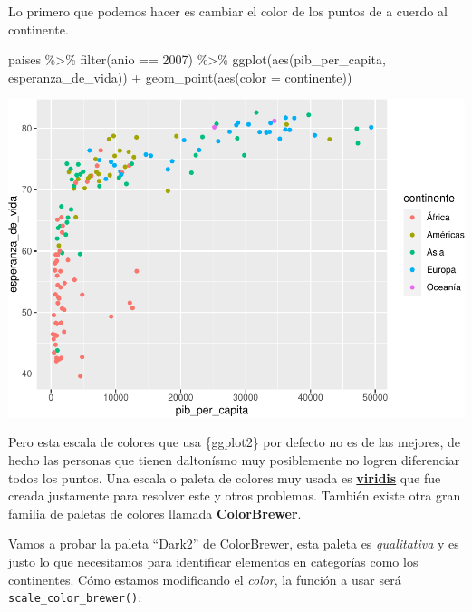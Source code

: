 \documentclass[
  openany]{book}
\newenvironment{Shaded}{\begin{snugshade}}{\end{snugshade}}
\newcommand{\AttributeTok}[1]{\textcolor[rgb]{0.77,0.63,0.00}{#1}}
\newcommand{\DecValTok}[1]{\textcolor[rgb]{0.00,0.00,0.81}{#1}}
\newcommand{\FunctionTok}[1]{\textcolor[rgb]{0.00,0.00,0.00}{#1}}
\newcommand{\NormalTok}[1]{#1}
\newcommand{\SpecialCharTok}[1]{\textcolor[rgb]{0.00,0.00,0.00}{#1}}
\begin{document}
Lo primero que podemos hacer es cambiar el color de los puntos de a cuerdo al continente.

\begin{Shaded}
\begin{Highlighting}[]
\NormalTok{paises }\SpecialCharTok{\%\textgreater{}\%} 
  \FunctionTok{filter}\NormalTok{(anio }\SpecialCharTok{==} \DecValTok{2007}\NormalTok{) }\SpecialCharTok{\%\textgreater{}\%} 
  \FunctionTok{ggplot}\NormalTok{(}\FunctionTok{aes}\NormalTok{(pib\_per\_capita, esperanza\_de\_vida)) }\SpecialCharTok{+}
  \FunctionTok{geom\_point}\NormalTok{(}\FunctionTok{aes}\NormalTok{(}\AttributeTok{color =}\NormalTok{ continente))}
\end{Highlighting}
\end{Shaded}

\begin{center}\includegraphics[width=1\linewidth]{DT6_files/figure-latex/unnamed-chunk-130-1} \end{center}

Pero esta escala de colores que usa \{ggplot2\} por defecto no es de las mejores, de hecho las personas que tienen daltonísmo muy posiblemente no logren diferenciar todos los puntos.
Una escala o paleta de colores muy usada es \href{https://cran.r-project.org/web/packages/viridis/vignettes/intro-to-viridis.html}{\textbf{viridis}} que fue creada justamente para resolver este y otros problemas.
También existe otra gran familia de paletas de colores llamada \href{https://colorbrewer2.org/}{\textbf{ColorBrewer}}.

Vamos a probar la paleta ``Dark2'' de ColorBrewer, esta paleta es \emph{qualitativa} y es justo lo que necesitamos para identificar elementos en categorías como los continentes.
Cómo estamos modificando el \emph{color}, la función a usar será \texttt{scale\_color\_brewer()}:
\end{document}
